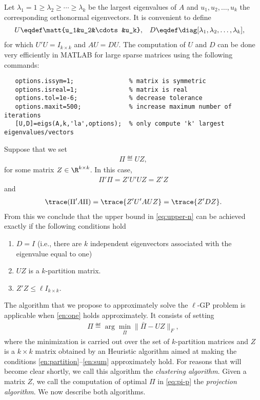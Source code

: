 \documentclass[10pt]{article}
\begin{document}
\medskip

Let $\lambda_1=1\geq \lambda_2\geq \cdots\geq \lambda_k$ be the largest
eigenvalues of $A$ and $u_1,u_2,\dots,u_k$ the corresponding
orthonormal eigenvectors. It is convenient to define
\begin{align*}
  U&\eqdef\matt{u_1&u_2&\cdots&u_k}, & D&\eqdef\diag[\lambda_1,\lambda_2,\dots,\lambda_k],
\end{align*}
for which $U' U=I_{k\times k}$ and $A U=D U$. The computation of $U$ and $D$ can
be done very efficiently in MATLAB for large sparse matrices using the
following commands:
\begin{verbatim}
   options.issym=1;               % matrix is symmetric
   options.isreal=1;              % matrix is real
   options.tol=1e-6;              % decrease tolerance 
   options.maxit=500;             % increase maximum number of iterations
   [U,D]=eigs(A,k,'la',options);  % only compute 'k' largest eigenvalues/vectors
\end{verbatim}

\medskip

Suppose that we set
\begin{align*}
  \Pi\eqdef U Z,
\end{align*}
for some matrix $Z\in\R^{k\times k}$. In this case,
\begin{align*}
  \Pi'\Pi=Z' U' U Z=Z' Z
\end{align*}
and 
\begin{align*}
  \trace(\Pi'A\Pi)=\trace{Z' U' A U Z}=\trace{Z' D Z}.
\end{align*}
From this we conclude that the upper bound in \eqref{eq:upper-n} can
be achieved exactly if the following conditions hold
\begin{enumerate}
\item \label{en:one} $D=I$ (i.e., there are $k$ independent eigenvectors
  associated with the eigenvalue equal to one)
\item \label{en:partition} $U Z$ is a $k$-partition matrix.
\item \label{en:sum} $Z' Z\leq \ell I_{k\times k}$.
\end{enumerate}
The algorithm that we propose to approximately solve the $\ell$-GP
problem is applicable when \ref{en:one} holds approximately. It
consists of setting
\begin{align}\label{eq:pi-p}
  \Pi\eqdef \arg \min_{\bar \Pi} \|\bar \Pi-U Z\|_F,
\end{align}
where the minimization is carried out over the set of $k$-partition
matrices and $Z$ is a $k\times k$ matrix obtained by an Heuristic algorithm
aimed at making the conditions \ref{en:partition}--\ref{en:sum}
approximately hold. For reasons that will become clear shortly, we
call this algorithm the \emph{clustering algorithm}. Given a matrix
$Z$, we call the computation of optimal $\Pi$ in \eqref{eq:pi-p} the
\emph{projection algorithm}. We now describe both algorithms.
\end{document}
